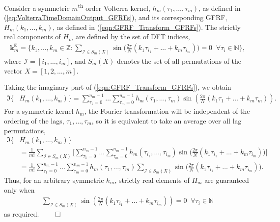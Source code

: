 \begin{thm}
\label{thm:GFRF_real_elements}
Consider a symmetric $m$\textsuperscript{th} order Volterra kernel, $h_m(\tau_1, \hdots, \tau_m)$, as defined in (\ref{eq:VolterraTimeDomainOutput_GFRFs}), and its corresponding GFRF, $H_m(k_1, \hdots,k_m)$, as defined in (\ref{eqn:GFRF_Transform_GFRFs}). The strictly real components of $H_m$ are defined by the set of DFT indices,
\begin{align*}
\mathbf{k}_m^{\mathbb{R}} = \{k_1, \hdots, k_m \in \mathbb{Z}: \sum_{\mathcal{I} \in S_m(X)} \sin \bigg( \frac{2 \pi}{N} (k_1 \tau_{i_1} + \hdots + k_m \tau_{i_m}) \bigg) = 0 \; \; \forall \tau_i \in \mathbb{N} \}, 
\end{align*}
where $\mathcal{I} = [i_1, \hdots, i_m]$, and $S_m(X)$ denotes the set of all permutations of the vector $X = [1, 2, \hdots,m]$.
\end{thm}
\begin{proof*}
Taking the imaginary part of (\ref{eqn:GFRF_Transform_GFRFs}), we obtain
\begin{align}
\mathfrak{I} \{ &H_m(k_1,\hdots,k_m) \} = \sum_{\tau_1 = 0}^{n_m-1} \hdots \sum_{\tau_m = 0}^{n_m-1} h_m(\tau_1,\hdots,\tau_m) \sin(\frac{2 \pi}{N}(k_1 \tau_1 + \hdots + k_m \tau_m)).
\end{align}
For a symmetric kernel $h_m$, the Fourier transformation will be independent of the ordering of the lags, $\tau_1,\hdots,\tau_m$, so it is equivalent to take an average over all lag permutations,
\begin{align}
\mathfrak{I} \{ &H_m(k_1,\hdots,k_m) \} \nonumber \\
&= \frac{1}{m!} \sum_{\mathcal{I} \in S_m(X)} \Bigg[ \sum_{\tau_1 = 0}^{n_m-1} \hdots \sum_{\tau_m = 0}^{n_m-1} h_m(\tau_{i_1},\hdots,\tau_{i_m}) \sin \bigg( \frac{2 \pi}{N}(k_1 \tau_{i_1} + \hdots + k_m \tau_{i_m}) \bigg) \Bigg] \\
&= \frac{1}{m!} \sum_{\tau_1 = 0}^{n_m-1} \hdots \sum_{\tau_m = 0}^{n_m-1} h_m(\tau_{1},\hdots,\tau_{m}) \sum_{\mathcal{I} \in S_m(X)} \sin \bigg( \frac{2 \pi}{N}(k_1 \tau_{i_1} + \hdots + k_m \tau_{i_m}) \bigg).
\end{align}
Thus, for an arbitrary symmetric $h_m$, strictly real elements of $H_m$ are guaranteed only when
\begin{align*}
\sum_{\mathcal{I} \in S_m(X)} \sin(\frac{2 \pi}{N}(k_1 \tau_{i_1} + \hdots + k_m \tau_{i_m})) = 0 \; \; \forall \tau_i \in \mathbb{N} 
\end{align*} 
as required. \hfill $\qed$
\end{proof*}

